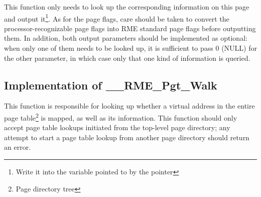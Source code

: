 This function only needs to look up the corresponding information on this page and output it\footnote{Write it into the variable pointed to by the pointer}. As for the page flags, care should be taken to convert the processor-recognizable page flags into RME standard page flags before outputting them. In addition, both output parameters should be implemented as optional: when only one of them needs to be looked up, it is sufficient to pass 0 (NULL) for the other parameter, in which case only that one kind of information is queried.

\subsection{Implementation of \_\_RME\_Pgt\_Walk}\label{subsec:7-rme-pgt-walk-implementation}

This function is responsible for looking up whether a virtual address in the entire page table\footnote{Page directory tree} is mapped, as well as its information. This function should only accept page table lookups initiated from the top-level page directory; any attempt to start a page table lookup from another page directory should return an error.

